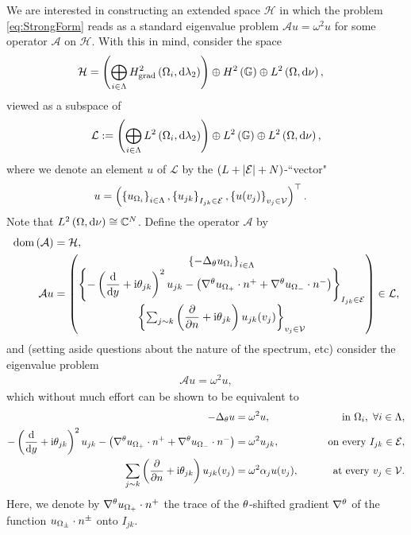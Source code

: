 We are interested in constructing an extended space $\mathcal{H}$ in which the problem \eqref{eq:StrongForm} reads as a standard eigenvalue problem $\mathcal{A} u = \omega^2 u$ for some operator $\mathcal{A}$ on $\mathcal{H}$.
With this in mind, consider the space
\begin{align*}
	\mathcal{H} &= \left( \bigoplus_{i\in\Lambda}H^2_\mathrm{grad}\left( \Omega_i, \mathrm{d}\lambda_2 \right) \right) \oplus H^2\left( \mathbb{G} \right) \oplus L^{2}\left( \Omega,\mathrm{d}\nu \right),
\end{align*}
viewed as a subspace of
\begin{align*}
	\mathcal{L} := \left( \bigoplus_{i\in\Lambda}L^{2}\left( \Omega_i,\mathrm{d}\lambda_2 \right) \right) \oplus L^2\left( \mathbb{G} \right) \oplus L^{2}\left( \Omega,\mathrm{d}\nu \right),
\end{align*}
where we denote an element $u$ of $\mathcal{L}$ by the $\left( L+\left\lvert \mathcal{E} \right\rvert+N \right)$-``vector"
\begin{align*}
	u &= \left( \left\{ u_{\Omega_i} \right\}_{i\in\Lambda}, \left\{ u_{jk} \right\}_{I_{jk}\in\mathcal{E}}, \left\{ u(v_j) \right\}_{v_j\in\mathcal{V}} \right)^\top.
\end{align*}
Note that $L^{2}\left( \Omega,\mathrm{d}\nu \right)\cong\mathbb{C}^N$.
Define the operator $\mathcal{A}$ by
\begin{align*}
	\mathrm{dom}\left( \mathcal{A} \right) &= \mathcal{H}, \\
	\mathcal{A} u &= 
	\begin{pmatrix}	
	\left\{ -\Delta_{\theta}u_{\Omega_i} \right\}_{i\in\Lambda} \\
	\left\{ -\left( \dfrac{\mathrm{d}}{\mathrm{d}y}+\mathrm{i}\theta_{jk} \right)^2 u_{jk} - \left( \nabla^{\theta} u_{\Omega_+}\cdot n^+ + \nabla^{\theta} u_{\Omega_-}\cdot n^- \right)  \right\}_{I_{jk}\in\mathcal{E}} \\
	\left\{ \sum_{j\sim k}\left( \dfrac{\partial }{\partial n}+\mathrm{i}\theta_{jk} \right)u_{jk}(v_j) \right\}_{v_j\in\mathcal{V}}
	\end{pmatrix}
	\in\mathcal{L},
\end{align*}
and (setting aside questions about the nature of the spectrum, etc) consider the eigenvalue problem
\begin{align*}
	\mathcal{A} u = \omega^2 u,
\end{align*}
which without much effort can be shown to be equivalent to
\begin{subequations} \label{eq:aopEvalProb}
	\begin{align}
		-\Delta_{\theta}u &= \omega^2 u, &\qquad\text{in } \Omega_i, \ \forall i\in\Lambda, \\
		-\left( \dfrac{\mathrm{d}}{\mathrm{d}y}+\mathrm{i}\theta_{jk} \right)^2 u_{jk} - \left( \nabla^{\theta} u_{\Omega_+}\cdot n^+ + \nabla^{\theta} u_{\Omega_-}\cdot n^- \right) &= \omega^2 u_{jk},  &\qquad\text{on every } I_{jk}\in\mathcal{E}, \\
		\sum_{j\sim k}\left( \dfrac{\partial }{\partial n}+\mathrm{i}\theta_{jk} \right)u_{jk}(v_j) &= \omega^2\alpha_j u(v_j), &\qquad\text{at every } v_j\in\mathcal{V}.		
	\end{align}
\end{subequations}
Here, we denote by $\nabla^{\theta} u_{\Omega_+}\cdot n^+$ the trace of the $\theta$-shifted gradient $\nabla^{\theta}$ of the function $u_{\Omega_{\pm}}\cdot n^{\pm}$ onto $I_{jk}$.


